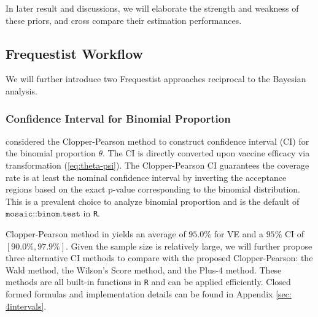 \documentclass[12pt]{amsart}
\begin{document}
In later result and discussions, we will elaborate the strength and weakness of these priors, and cross compare their estimation performances.

\subsection{Frequestist Workflow}
We will further introduce two Frequestist approaches reciprocal to the Bayesian analysis.
\subsubsection{Confidence Interval for Binomial Proportion}

\cite{paper} considered the Clopper-Pearson method to construct confidence interval (CI) for the binomial proportion $\theta$. The CI is directly converted upon vaccine efficacy via transformation (\ref{eq:theta-psi}). The Clopper-Pearson CI guarantees the coverage rate is at least the nominal confidence interval by inverting the acceptance regions based on the exact p-value corresponding to the binomial distribution. This is a prevalent choice to analyze binomial proportion and is the default of $\texttt{mosaic::binom.test}$ in \texttt{R}.

Clopper-Pearson method in \cite{paper} yields an average of $95.0\%$ for VE and a $95\%$ CI of $[90.0\%, 97.9\%]$.
Given the sample size is relatively large, we will further propose three alternative CI methods to compare with the proposed Clopper-Pearson: the Wald method, the Wilson's Score method, and the Plus-4 method. These methods are all built-in functions in \texttt{R} and can be applied efficiently. Closed formed formulas and implementation details can be found in Appendix \ref{sec: 4intervals}. 

 
\end{document}
